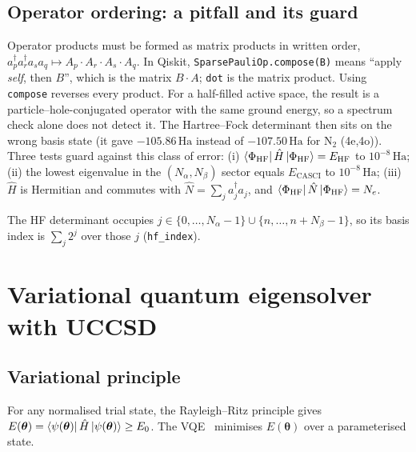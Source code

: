 \documentclass[10pt,a4paper]{article}
\newcommand{\Ha}{\,\mathrm{Ha}}
\newcommand{\cre}[1]{a^{\dagger}_{#1}}
\newcommand{\ann}[1]{a_{#1}}
\newcommand{\code}[1]{\texttt{\small #1}}
\begin{document}
\subsection{Operator ordering: a pitfall and its guard}
Operator products must be formed as matrix products in written order, $\cre p\cre r\ann s\ann q \mapsto A_p\cdot A_r\cdot A_s\cdot A_q$. In Qiskit, \code{SparsePauliOp.compose(B)} means ``apply \emph{self}, then $B$'', which is the matrix $B\cdot A$; \code{dot} is the matrix product. Using \code{compose} reverses every product. For a half-filled active space, the result is a particle--hole-conjugated operator with the same ground energy, so a spectrum check alone does not detect it. The Hartree--Fock determinant then sits on the wrong basis state (it gave $-105.86\Ha$ instead of $-107.50\Ha$ for N$_2$ (4e,4o)). Three tests guard against this class of error: (i) $\bra{\Phi_{\mathrm{HF}}}\hat H\ket{\Phi_{\mathrm{HF}}}=E_{\mathrm{HF}}$ to $10^{-8}\Ha$; (ii) the lowest eigenvalue in the $(N_\alpha,N_\beta)$ sector equals $E_{\mathrm{CASCI}}$ to $10^{-8}\Ha$; (iii) $\hat H$ is Hermitian and commutes with $\hat N=\sum_j \cre j\ann j$, and $\bra{\Phi_{\mathrm{HF}}}\hat N\ket{\Phi_{\mathrm{HF}}}=N_e$.

The HF determinant occupies $j\in\{0,\dots,N_\alpha-1\}\cup\{n,\dots,n+N_\beta-1\}$, so its basis index is $\sum_j 2^j$ over those $j$ (\code{hf\_index}).

\section{Variational quantum eigensolver with UCCSD}\label{sec:vqe}
\subsection{Variational principle}
For any normalised trial state, the Rayleigh--Ritz principle gives $E(\bm\theta)=\bra{\psi(\bm\theta)}\hat H\ket{\psi(\bm\theta)}\ge E_0$. The VQE~\cite{Peruzzo2014,McArdle2020} minimises $E(\bm\theta)$ over a parameterised state.
\end{document}
